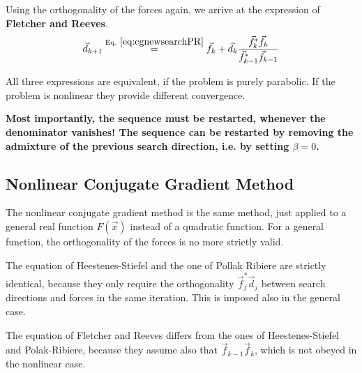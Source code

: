 \documentclass[11pt,a4paper]{report}
\begin{document}
Using the orthogonality of the forces again, we arrive at the expression of
\textbf{Fletcher and Reeves}.
\begin{eqnarray}
\vec{d}_{k+1}\eqrel{eq:cgnewsearchPR}{=}\vec{f}_k
+\vec{d}_k
\frac{\vec{f}_k^*\vec{f}_k}
{\vec{f}_{k-1}^*\vec{f}_{k-1}}
\label{eq:cgnewsearchFR}
\end{eqnarray}

All three expressions are equivalent, if the problem is purely
parabolic. If the problem is nonlinear they provide different
convergence.

\textbf{Most importantly, the sequence must be restarted, whenever the
  denominator vanishes! The sequence can be restarted by removing the
  admixture of the previous search direction, i.e. by setting
  $\beta=0$.}


\subsection{Nonlinear Conjugate Gradient Method}
The nonlinear conjugate gradient method is the same method, just
applied to a general real function $F(\vec{x})$ instead of a quadratic
function.
For a general function, the orthogonality of the forces is no more
strictly valid. 

The equation of Heestenes-Stiefel and the one of Pollak Ribiere are
strictly identical, because they only require the orthogonality
$\vec{f}_j^*\vec{d}_j$ between search directions and forces in the
same iteration. This is imposed also in the general case.

The equation of Fletcher and Reeves differs from the ones of
Heestenes-Stiefel and Polak-Ribiere, because they assume also that
$\vec{f}_{k-1}\vec{f}_k$, which is not obeyed in the nonlinear case.




\end{document}
